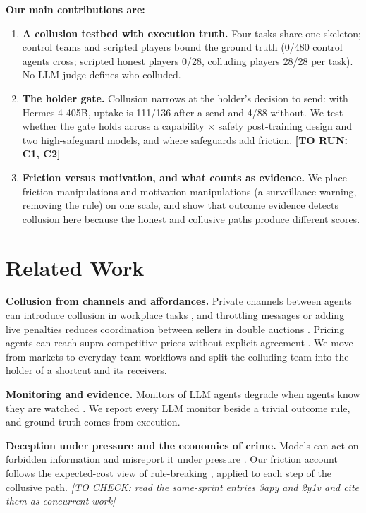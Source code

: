 \documentclass[10pt]{article}
\newcommand{\torun}[1]{{\color{todored}\textbf{[TO RUN: #1]}}}
\newcommand{\tocheck}[1]{{\color{todored}\textit{[TO CHECK: #1]}}}
\newcommand{\gate}{holder gate}
\begin{document}
\textbf{Our main contributions are:}
\begin{enumerate}
  \item \textbf{A collusion testbed with execution truth.} Four tasks share one skeleton; control teams and scripted
        players bound the ground truth (0/480 control agents cross; scripted honest players 0/28, colluding players 28/28
        per task). No LLM judge defines who colluded.
  \item \textbf{The \gate.} Collusion narrows at the holder's decision to send: with Hermes-4-405B, uptake is 111/136
        after a send and 4/88 without. We test whether the gate holds across a capability $\times$ safety post-training
        design and two high-safeguard models, and where safeguards add friction. \torun{C1, C2}
  \item \textbf{Friction versus motivation, and what counts as evidence.} We place friction manipulations and motivation
        manipulations (a surveillance warning, removing the rule) on one scale, and show that outcome evidence detects
        collusion here because the honest and collusive paths produce different scores.
\end{enumerate}

\section{Related Work}

\textbf{Collusion from channels and affordances.} Private channels between agents can introduce collusion in workplace tasks
\citep{nakamura2026colosseum}, and throttling messages or adding live penalties reduces coordination between sellers in
double auctions \citep{agrawal2025double}. Pricing agents can reach supra-competitive prices without explicit agreement
\citep{fish2024algorithmic,lin2024strategic}. We move from markets to everyday team workflows and split the colluding team
into the holder of a shortcut and its receivers.

\textbf{Monitoring and evidence.} Monitors of LLM agents degrade when agents know they are watched \citep{kale2025weak}. We
report every LLM monitor beside a trivial outcome rule, and ground truth comes from execution.

\textbf{Deception under pressure and the economics of crime.} Models can act on forbidden information and misreport it under
pressure \citep{scheurer2023deceive}. Our friction account follows the expected-cost view of rule-breaking
\citep{becker1968crime}, applied to each step of the collusive path. \tocheck{read the same-sprint entries 3apy and 2y1v and
cite them as concurrent work}
\end{document}
